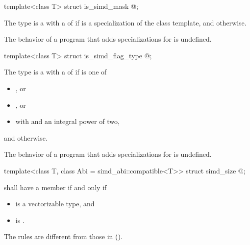 \begin{itemdecl}
template<class T> struct is_simd_mask { @\seebelow@ };
\end{itemdecl}
\begin{itemdescr}
\pnum
The type  is a  with a  of  if  is a specialization of the  class template, and  otherwise.

\pnum
The behavior of a program that adds specializations for  is undefined.
\begin{itemdescr}

\begin{itemdecl}
template<class T> struct is_simd_flag_type { @\seebelow@ };
\end{itemdecl}
\begin{itemdescr}
\pnum
The type  is a  with a  of  if  is one of
\begin{itemize}
  \item {}, or
  \item {}, or
  \item {} with  and  an integral power of two,
\end{itemize}
and  otherwise.

\pnum
The behavior of a program that adds specializations for  is undefined.
\end{itemdescr}

\begin{itemdecl}
template<class T, class Abi = simd_abi::compatible<T>> struct simd_size { @\seebelow@ };
\end{itemdecl}
\begin{itemdescr}
\pnum
{} shall have a member  if and only if
\begin{itemize}
  \item {} is a vectorizable type, and
  \item {} is .
\end{itemize}
\begin{note}
  The rules are different from those in ().
\end{note}


\end{itemdescr}
\end{itemdescr}
\end{itemdescr}
